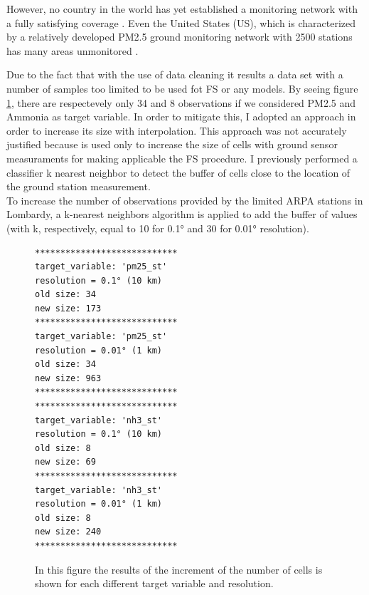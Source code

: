 However, no country in the world has yet established a monitoring network with a fully satisfying coverage \cite{liu2018improve}. Even the United States (US), which is characterized by a relatively developed PM2.5 ground monitoring network with 2500 stations has many areas unmonitored \cite{liu2018improve}. \par
Due to the fact that with the use of data cleaning it results a data set with a number of samples too limited to be used fot FS or any models.
By seeing figure \ref{fig:cells}, there are respectevely only 34 and 8 observations if we considered PM2.5 and Ammonia as target variable.
In order to mitigate this, I adopted an approach in order to increase its size with interpolation.
This approach was not accurately justified because is used only to increase the size of cells with ground sensor measuraments for making applicable the FS procedure.
I previously performed a classifier k nearest neighbor  \cite{taunk2019brief} to detect the buffer of cells close to the location of the ground station measurement.\\
To increase the number of observations provided by the limited ARPA stations in Lombardy, a k-nearest neighbors algorithm is applied to add the buffer of values (with k, respectively, equal to 10 for 0.1° and 30 for 0.01° resolution). \\ 

\begin{figure}
\begin{multicols}{2}
\begin{verbatim}
****************************
target_variable: 'pm25_st'
resolution = 0.1° (10 km)
old size: 34
new size: 173 
****************************
target_variable: 'pm25_st'
resolution = 0.01° (1 km)
old size: 34
new size: 963 
****************************
****************************
target_variable: 'nh3_st'
resolution = 0.1° (10 km)
old size: 8
new size: 69 
****************************
target_variable: 'nh3_st'
resolution = 0.01° (1 km)
old size: 8
new size: 240 
****************************
\end{verbatim}
\end{multicols}
\caption{In this figure the results of the increment of the number of cells is shown for each different target variable and resolution.}
\label{fig:cells}
\end{figure}

